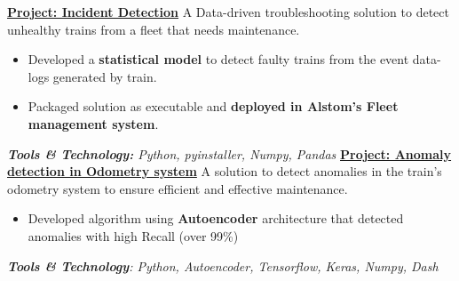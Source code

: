 \documentclass[letterpaper]{DS_class_file} %
\begin{document}
\begin{twenty}
{        \vspace{0.3cm}
        \underline{\textbf{Project: Incident Detection}}
        \vspace{0.1cm} 
        \newline
        A Data-driven troubleshooting solution to detect unhealthy trains from a fleet that needs maintenance. 
        \begin{itemize}
            \item Developed a \textbf{statistical model} to detect faulty trains from the event data-logs generated by train. 
            \item Packaged solution as executable and \textbf{deployed in Alstom's Fleet management system}. 
        \end{itemize}
        \textit{\textbf{Tools \& Technology:} Python, pyinstaller, Numpy, Pandas}
        \vspace{0.3cm}
        \newline 
        \underline{\textbf{Project: Anomaly detection in Odometry system}}
        \vspace{0.1cm} 
        \newline
        A solution to detect anomalies in the train's odometry system to ensure efficient and effective maintenance.
        \begin{itemize}
            \item Developed algorithm using \textbf{Autoencoder} architecture that detected anomalies with high Recall (over 99\%)
		\end{itemize}
        \textit{\textbf{Tools \& Technology}: Python, Autoencoder, Tensorflow, Keras, Numpy, Dash}
		}
		\\

\end{twenty}
\end{document}
